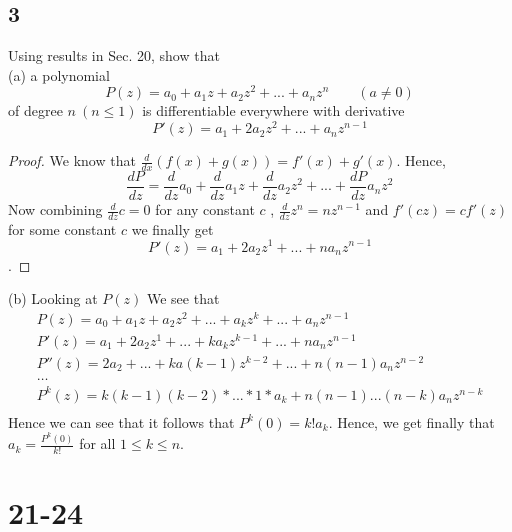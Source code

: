 \documentclass{article}
\begin{document}
    \subsection*{3}
    Using results in Sec. 20, show that \\
    (a) a polynomial $$P(z) = a_0 + a_1z + a_2z^2 + ... + a_nz^n \qquad (a \neq 0)$$
    of degree $n \ (n \leq 1)$ is differentiable everywhere with derivative
    $$P'(z) = a_1 + 2a_2z^2 + ... + a_nz^{n-1}$$
    \begin{proof}
        We know that $\frac{d}{dx}(f(x) + g(x)) = f'(x) + g'(x)$. Hence,
        $$\frac{dP}{dz} = \frac{d}{dz}a_0 + \frac{d}{dz}a_1z + \frac{d}{dz}a_2z^2 + ...
        + \frac{dP}{dz}a_nz^2$$ Now combining $\frac{d}{dz}c = 0$ for any constant $c$
        , $\frac{d}{dz} z^n = nz^{n-1}$ and $f'(cz)=cf'(z)$ for some constant $c$ we finally get
        $$P'(z) = a_1 + 2a_2z^1 + ... + na_nz^{n-1}$$.
    \end{proof}
    (b) Looking at $P(z)$ We see that
    \begin{gather*}
        P(z) = a_0 + a_1z + a_2z^2 + ... + a_kz^k + ... + a_nz^{n-1} \\
        P'(z) = a_1 + 2a_2z^1 + ... + ka_kz^{k-1} + ... + na_nz^{n-1} \\
        P''(z) = 2a_2 + ... + ka(k-1)z^{k-2} + ... + n(n-1)a_nz^{n-2} \\
        \dots \\
        P^k(z) = k(k-1)(k-2)*...*1*a_k + n(n-1)...(n-k)a_nz^{n-k} \\ 
    \end{gather*}
    Hence we can see that it follows that $P^k(0) = k!a_k$. Hence, we get finally 
    that $a_k = \frac{P^k(0)}{k!}$ for all $1\leq k \leq n$.
    \section*{21-24}
\end{document}
